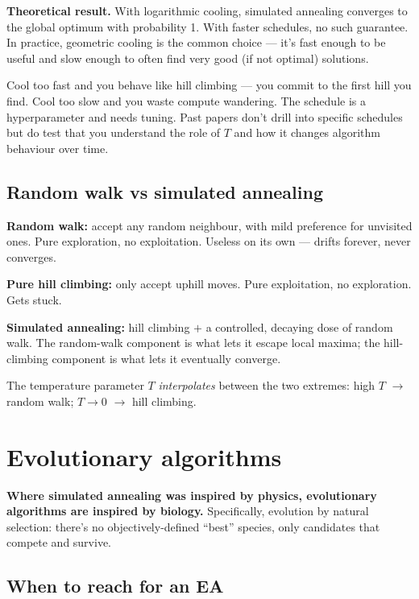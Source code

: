 \documentclass[11pt, a4paper]{article}
\begin{document}
\textbf{Theoretical result.} With logarithmic cooling, simulated annealing converges to the global optimum with probability 1. With faster schedules, no such guarantee. In practice, geometric cooling is the common choice — it's fast enough to be useful and slow enough to often find very good (if not optimal) solutions.

\begin{pitfallbox}
Cool too fast and you behave like hill climbing — you commit to the first hill you find. Cool too slow and you waste compute wandering. The schedule is a hyperparameter and needs tuning. Past papers don't drill into specific schedules but do test that you understand the role of $T$ and how it changes algorithm behaviour over time.
\end{pitfallbox}

\subsection{Random walk vs simulated annealing}

\textbf{Random walk:} accept any random neighbour, with mild preference for unvisited ones. Pure exploration, no exploitation. Useless on its own — drifts forever, never converges.

\textbf{Pure hill climbing:} only accept uphill moves. Pure exploitation, no exploration. Gets stuck.

\textbf{Simulated annealing:} hill climbing $+$ a controlled, decaying dose of random walk. The random-walk component is what lets it escape local maxima; the hill-climbing component is what lets it eventually converge.

The temperature parameter $T$ \emph{interpolates} between the two extremes: high $T$ $\to$ random walk; $T \to 0$ $\to$ hill climbing.

\section{Evolutionary algorithms}

\textbf{Where simulated annealing was inspired by physics, evolutionary algorithms are inspired by biology.} Specifically, evolution by natural selection: there's no objectively-defined ``best'' species, only candidates that compete and survive.

\subsection{When to reach for an EA}
\end{document}
